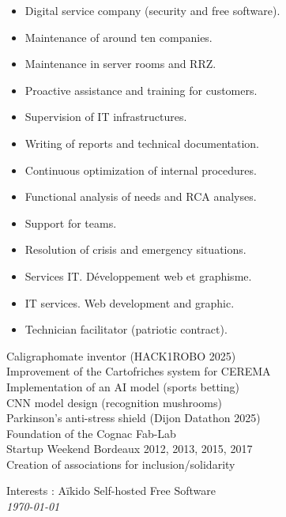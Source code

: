 \documentclass[10pt,a4paper,ragged2e,withhyper,normalphoto]{altacv}
\begin{document}
\begin{paracol}{2}
\switchcolumn

\begin{itemize}
\item Digital service company (security and free software).
\item Maintenance of around ten companies.
\item Maintenance in server rooms and RRZ.
\item Proactive assistance and training for customers.
\item Supervision of IT infrastructures.
\item Writing of reports and technical documentation.
\item Continuous optimization of internal procedures.
\item Functional analysis of needs and RCA analyses.
\item Support for teams.
\item Resolution of crisis and emergency situations.
\end{itemize}
\divider
{}
\begin{itemize}
\item Services IT. Développement web et graphisme.
\item IT services. Web development and graphic.
\end{itemize}
\divider
{}
\begin{itemize}
\item Technician facilitator (patriotic contract).
\end{itemize}

{\faRobot}{Caligraphomate inventor (HACK1ROBO 2025)}\\
{\faChartLine}{Improvement of the Cartofriches system for CEREMA}\\
{\faCogs}{Implementation of an AI model (sports betting)}\\
{\faEye}{CNN model design (recognition mushrooms)}\\
{\faMedkit}{Parkinson's anti-stress shield (Dijon Datathon 2025)}\\
{\faLightbulb}{Foundation of the Cognac Fab-Lab}\\
{\faFlask}{Startup Weekend Bordeaux 2012, 2013, 2015, 2017}\\
{\faHandHoldingHeart}{Creation of associations for inclusion/solidarity}

\divider

Interests : {\faUserNinja} Aïkido {\faServer} Self-hosted {\faLinux} Free Software\\

\raggedleft
\bigskip
\bigskip
{\textit{\today}}
\end{paracol}
\end{document}
